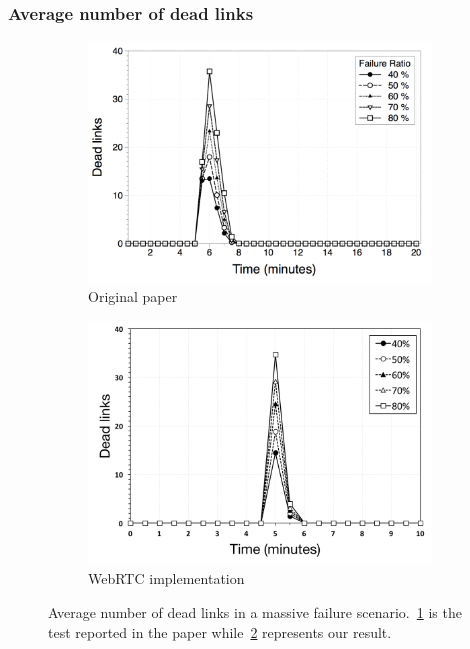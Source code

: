\documentclass{beamer}
\begin{document}
\begin{frame}
\frametitle{Average number of dead links}
    
\begin{figure}
\centering
\begin{subfigure}{.5\textwidth}
  \centering
  \includegraphics[keepaspectratio=true, width=1\linewidth]{images/paper_average_dead_links}
  \caption{Original paper}
  \label{fig:paper_average_dead_links}
\end{subfigure}%
\begin{subfigure}{.5\textwidth}
  \centering
  \includegraphics[keepaspectratio=true, width=1\linewidth]{images/average_dead_links}
  \caption{WebRTC implementation}
  \label{fig:average_dead_links}
\end{subfigure}
\caption{Average number of dead links in a massive failure scenario.~\ref{fig:paper_average_dead_links} is the test reported in the paper while~\ref{fig:average_dead_links} represents our result.}
\label{fig:robustness_dead_links_failures}
\end{figure}

\end{frame}
\end{document}
